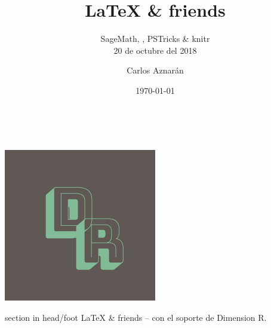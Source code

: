 \documentclass[spanish]{beamer}
\title[\LaTeX{} \& friends]{\LaTeX{} \& friends}
\subtitle{SageMath, \ararawhite, PSTricks \& knitr\\[\baselineskip]
20 de octubre del 2018}
\author[Dimension R]{Carlos Aznarán}
\institute[Universidad Nacional de Ingeniería]{Matemáticas\\
Facultad de Ciencias\\
Universidad Nacional de Ingeniería}
\date[\today]{\today}
\begin{document}
\begin{frame}
\titlepage
\end{frame}

\begin{frame}
\frametitle{\contentsname}
\tableofcontents
\end{frame}







\begin{frame}[plain,b]
\centering
\huge \textcolor{white}{¡Gracias por su atención!}
\normalsize
\begin{center}
	\includegraphics[width=0.5\textwidth]{DimensionR}\\
\end{center}
\vspace*{\fill}

\begin{beamercolorbox}[wd=\paperwidth]{section in head/foot}
\centering\large
\LaTeX{} \& friends -- con el soporte de Dimension R.
\vskip10pt
\end{beamercolorbox}
\end{frame}
\end{document}
